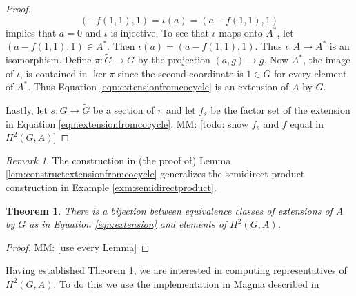 \documentclass{dcthesis}
\newcommand{\mm}[1]{{\color{blue} \sf MM: [#1]}}
\newcommand{\wt}[1]{\widetilde{#1}}
\renewcommand{\ker}{\operatorname{ker}}
\newtheorem{theorem}[prop]{Theorem}
\theoremstyle{definition}
\theoremstyle{remark}
\newtheorem{remark}[prop]{Remark}
\numberwithin{equation}{section}
\numberwithin{figure}{section}
\begin{document}
{{\begin{proof}
\begin{equation}
        (-f(1,1),1) =\iota(a)
                    =(a-f(1,1),1)
      \end{equation}
      implies that $a=0$
      and $\iota$ is injective.
      To see that $\iota$ maps onto $A^*$,
      let $(a-f(1,1),1)\in A^*$.
      Then $\iota(a)=(a-f(1,1),1)$.
      Thus $\iota\colon A\to A^*$ is an isomorphism.
      Define $\pi\colon\wt{G}\to G$ by
      the projection
      $(a,g)\mapsto g$.
      Now $A^*$, the image of $\iota$,
      is contained in $\ker\pi$
      since the second coordinate is $1\in G$
      for every element of $A^*$.
      Thus
      Equation
      \ref{eqn:extensionfromcocycle}
      is an extension of $A$ by $G$.
      \par
      Lastly,
      let $s\colon G\to\wt{G}$
      be a section of $\pi$
      and let $f_s$ be the factor set
      of the extension in
      Equation
      \ref{eqn:extensionfromcocycle}.
      \mm{todo: show $f_s$ and $f$ equal in $H^2(G,A)$}
    \end{proof}
    \begin{remark}
      \label{rmk:semidirectproducttrivialcocycle}
      The construction in (the proof of)
      Lemma \ref{lem:constructextensionfromcocycle}
      generalizes the semidirect product construction
      in Example \ref{exm:semidirectproduct}.
    \end{remark}
    \begin{theorem}
      \label{thm:dfthm36}
      There is a bijection between equivalence
      classes of extensions of $A$ by $G$
      as in Equation
      \ref{eqn:extension}
      and
      elements of $H^2(G,A)$.
    \end{theorem}
    \begin{proof}
      \mm{use every Lemma}
    \end{proof}
    Having established Theorem \ref{thm:dfthm36},
    we are interested in computing representatives
    of $H^2(G,A)$.
    To do this
    we use the implementation
    in \textsf{Magma} described in
}}
\end{document}
